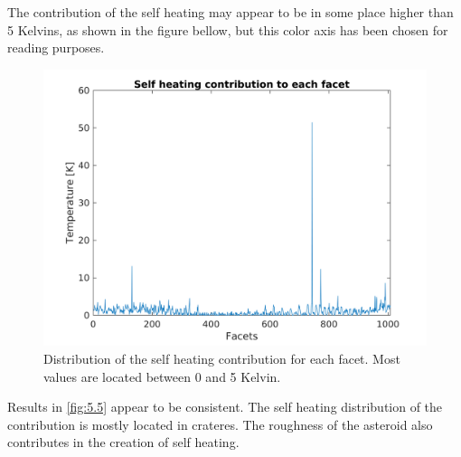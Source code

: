 The contribution of the self heating may appear to be in some place higher than 5 Kelvins, as shown in the figure bellow, but this color axis has been chosen for reading purposes.
\begin{figure}
    \centering
    \includegraphics[width=\linewidth]{rsc/self_contribution.png}
    \caption{Distribution of the self heating contribution for each facet. Most values are located between 0 and 5 Kelvin.}
    \label{fig:5.4}
\end{figure}

Results in \autoref{fig:5.5} appear to be consistent. The self heating distribution of the contribution is mostly located in crateres. The roughness of the asteroid also contributes in the creation of self heating.
